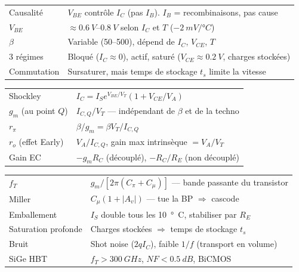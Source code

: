 \documentclass[12pt,a4paper,twoside]{book}
\begin{document}
\begin{bases}[title={\color{white} Résumé --- Les Bases}]
\begin{center}
\renewcommand{\arraystretch}{1.3}
\begin{tabular}{p{3.5cm}p{9.5cm}}
\toprule
Causalité & $V_{BE}$ contrôle $I_C$ (pas $I_B$). $I_B$ = recombinaisons, pas cause \\
$V_{BE}$ & $\approx \SI{0.6}{V}$--$\SI{0.8}{V}$ selon $I_C$ et $T$ ($\SI{-2}{mV/°C}$) \\
$\beta$ & Variable (50--500), dépend de $I_C$, $V_{CE}$, $T$ \\
3 régimes & Bloqué ($I_C \approx 0$), actif, saturé ($V_{CE} \approx \SI{0.2}{V}$, charges stockées) \\
Commutation & Sursaturer, mais temps de stockage $t_s$ limite la vitesse \\
\bottomrule
\end{tabular}
\end{center}
\end{bases}

\begin{approfondissement}[title={\color{white} Résumé --- Approfondissement}]
\begin{center}
\renewcommand{\arraystretch}{1.3}
\begin{tabular}{p{3.5cm}p{9.5cm}}
\toprule
Shockley & $I_C = I_S e^{V_{BE}/V_T}(1+V_{CE}/V_A)$ \\
$g_m$ (au point $Q$) & $I_{C,Q}/V_T$ --- indépendant de $\beta$ et de la techno \\
$r_\pi$ & $\beta/g_m = \beta V_T/I_{C,Q}$ \\
$r_o$ (effet Early) & $V_A/I_{C,Q}$, gain max intrinsèque $= V_A/V_T$ \\
Gain EC & $-g_m R_C$ (découplé), $-R_C/R_E$ (non découplé) \\
\bottomrule
\end{tabular}
\end{center}
\end{approfondissement}

\begin{ingenieur}[title={\color{white} Résumé --- Niveau Ingénieur}]
\begin{center}
\renewcommand{\arraystretch}{1.3}
\begin{tabular}{p{3.5cm}p{9.5cm}}
\toprule
$f_T$ & $g_m/[2\pi(C_\pi+C_\mu)]$ --- bande passante du transistor \\
Miller & $C_\mu(1+|A_v|)$ --- tue la BP $\Rightarrow$ cascode \\
Emballement & $I_S$ double tous les \SI{10}{°C}, stabiliser par $R_E$ \\
Saturation profonde & Charges stockées $\Rightarrow$ temps de stockage $t_s$ \\
Bruit & Shot noise ($2qI_C$), faible $1/f$ (transport en volume) \\
SiGe HBT & $f_T > \SI{300}{GHz}$, $NF < \SI{0.5}{dB}$, BiCMOS \\
\bottomrule
\end{tabular}
\end{center}
\end{ingenieur}
\end{document}
